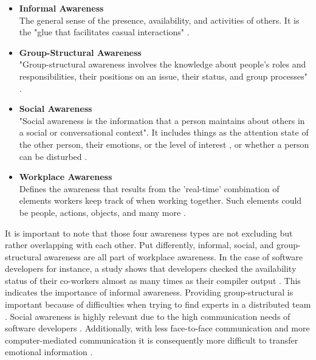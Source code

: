\begin{itemize}[itemsep=0ex, parsep=0ex, leftmargin=*]
      \item \textbf{Informal Awareness} \\
            The general sense of the presence, availability, and activities of others. It is the "glue that facilitates casual interactions" \autocite{gutwin1996workspace}.
      \item \textbf{Group-Structural Awareness} \\
            "Group-structural awareness involves the knowledge about people’s
            roles and responsibilities, their positions on an issue, their status, and group processes" \autocite{gutwin1996workspace}.
      \item \textbf{Social Awareness} \\
            "Social awareness is the information that a person maintains about others in a social or conversational context"\autocite{gutwin1996workspace}. It includes things as the attention state of the other person, their emotions, or the level of interest \autocite{gutwin1996workspace}, or whether a person can be disturbed \autocite{gutwin1995support}.
      \item \textbf{Workplace Awareness} \\
            Defines the awareness that results from the 'real-time' combination of elements workers keep track of when working together. Such elements could be people, actions, objects, and many more \autocite{gutwin1995support}.
\end{itemize}

It is important to note that those four awareness types are not excluding but rather overlapping with each other. Put differently, informal, social, and group-structural awareness are all part of workplace awareness. In the case of software developers for instance, a study shows that developers checked the availability status of their co-workers almost as many times as their compiler output \autocite{ko2007information}. This indicates the importance of informal awareness. Providing group-structural is important because of difficulties when trying to find experts in a distributed team \autocite{herbsleb2003empirical}. Social awareness is highly relevant due to the high communication needs of software developers \autocite{perry1994people}. Additionally, with less face-to-face communication and more computer-mediated communication it is consequently more difficult to transfer emotional information \autocite{rivera1996effects}.

